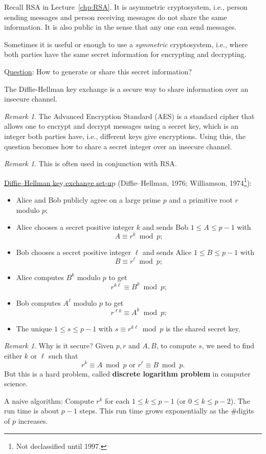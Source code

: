 \documentclass{amsbook}
\theoremstyle{plain}
\theoremstyle{definition}
\theoremstyle{remark}
\newtheorem{remark}[theorem]{Remark}
\numberwithin{equation}{chapter}
\numberwithin{figure}{chapter}
\begin{document}
Recall RSA in Lecture~\ref{chp:RSA}. It is asymmetric cryptosystem, i.e., person sending messages and person receiving messages do not share the same information. It is also public in the sense that any one can send messages.

Sometimes it is useful or enough to use a \emph{symmetric} cryptosystem, i.e., where both parties have the same secret information for encrypting and decrypting.

Q\underline{uestion}: How to generate or share this secret information?

The Diffie-Hellman key exchange is a secure way to share information over an insecure channel.
\begin{remark}
The Advanced Encryption Standard (AES) is a standard cipher that allows one to encrypt and decrypt messages using a secret key, which is an integer both parties have, i.e., different keys give encryptions. Using this, the question becomes how to share a secret integer over an insecure channel.
\end{remark}
\begin{remark}
This is often used in conjunction with RSA.
\end{remark}
\underline{Diffie--Hellman ke}y\underline{ exchan}g\underline{e set-u}p (Diffie--Hellman, 1976; Williamson, 1974\footnote{Not declassified until 1997.}): 
\begin{itemize} 
\item Alice and Bob publicly agree on a large prime $p$ and a primitive root $r$ modulo $p$;
\item Alice chooses a secret positive integer $k$ and sends Bob $1 \leqslant A \leqslant p - 1$ with 
\[
A \equiv r^k \bmod p;
\] 
\item Bob chooses a secret positive integer $\ell$ and sends Alice $1 \leqslant B \leqslant p - 1$ with
  \[
    B \equiv r^\ell \bmod p;
  \]
\item Alice computes $B^k$ modulo $p$ to get
  \[
    r^{k \ell} \equiv B^k \bmod p;
  \]
\item Bob computes $A^\ell$ modulo $p$ to get
  \[
    r^{\ell k} \equiv A^k \bmod p;
  \]
\item The unique $1 \leqslant s \leqslant p - 1$ with $s \equiv r^{k \ell} \bmod p$ is the shared secret key.
\end{itemize}
\begin{remark}
  Why is it secure? Given $p, r$ and $A, B$, to compute $s$, we need to find either $k$ or $\ell$ such that
  \[
    r^k \equiv A \bmod p \text{ or } r^\ell \equiv B \bmod p.
  \]
  But this is a hard problem, called \textbf{discrete logarithm problem} in computer science.
\end{remark}
A naive algorithm: Compute $r^k$ for each $1 \leqslant k \leqslant p - 1$ (or $0 \leqslant k \leqslant p - 2$). The run time is about $p - 1$ steps. This run time grows exponentially as the \#digits of $p$ increases.
\end{document}
